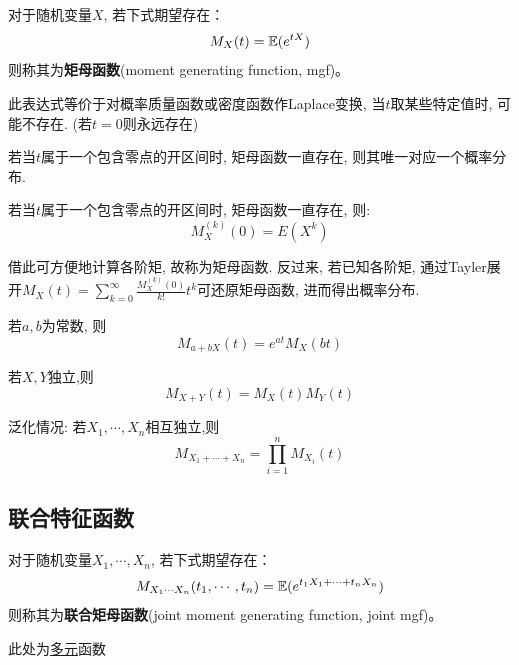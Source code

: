 \begin{definition}
    对于随机变量$X$, 若下式期望存在：
    \[ M_X(t) = \mathbb{E}(e^{tX}) \]
    则称其为\textbf{矩母函数}(moment generating function, mgf)。
\end{definition}

\begin{remark}
    此表达式等价于对概率质量函数或密度函数作Laplace变换, 当$t$取某些特定值时, 可能不存在. (若$t=0$则永远存在)
\end{remark}

\begin{theorem}
    若当$t$属于一个包含零点的开区间时, 矩母函数一直存在, 则其唯一对应一个概率分布.
\end{theorem}

\begin{theorem}
    若当$t$属于一个包含零点的开区间时, 矩母函数一直存在, 则:
    \[ M_X^{(k)}(0) = E(X^k) \]
\end{theorem}

\begin{remark}
    借此可方便地计算各阶矩, 故称为矩母函数. 反过来, 若已知各阶矩, 通过Tayler展开$M_X(t)=\sum_{k=0}^{\infty}\frac{M_X^{(k)}(0)}{k!}t^k$可还原矩母函数, 进而得出概率分布.
\end{remark}

\begin{proposition}
    若$a,b$为常数, 则
    \[ M_{a+b X}(t) = e^{a t}M_X(b t) \]
\end{proposition}

\begin{theorem}\label{thm:mgf_sum}
    若$X,Y$独立,则
    \[ M_{X+Y}(t) = M_X(t) M_Y(t) \]

    泛化情况: 若$X_1,\cdots, X_n$相互独立,则
    \[ M_{X_1+\cdots+ X_n} = \prod_{i=1}^n M_{X_i}(t)\]
\end{theorem}

\subsection{联合特征函数}

\begin{definition}
    对于随机变量$X_1,\cdots, X_n$, 若下式期望存在：
    \[ M_{X_1\cdots X_n}(t_1,\cdots ,t_n) = \mathbb{E}(e^{t_1 X_1+\cdots + t_n X_n}) \]
    则称其为\textbf{联合矩母函数}(joint moment generating function, joint mgf)。
\end{definition}

\begin{remark}
    此处为\underline{多元}函数
\end{remark}

